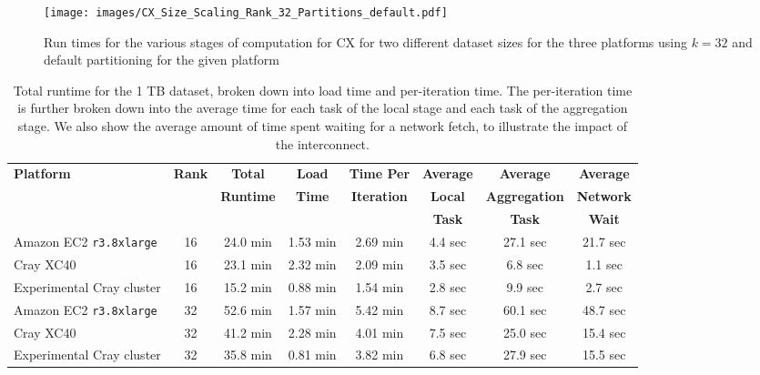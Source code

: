     \begin{figure} [H]
    \begin{centering}
    \texttt{[image: images/CX\_Size\_Scaling\_Rank\_32\_Partitions\_default.pdf]}
    \end{centering}
    \caption{ Run times for the various stages of computation for CX for two different dataset sizes for the three platforms using $k=32$ and default partitioning for the given platform}
    \label{fig:h2hrank32} 
    \end{figure}
    
    \begin{table*}
    \begin{center}
    \begin{tabular}{| l | c | c | c | c | c | c | c |}
    \toprule
    \textbf{Platform} & \textbf{Rank} & \textbf{Total} & \textbf{Load} & \textbf{Time Per} & \textbf{Average} & \textbf{Average} & \textbf{Average} \\
                               & & \textbf{Runtime} & \textbf{Time} & \textbf{Iteration} & \textbf{Local} & \textbf{Aggregation} & \textbf{Network} \\
                               & & & & & \textbf{Task} & \textbf{Task} & \textbf{Wait} \\
    \midrule
    Amazon EC2 \texttt{r3.8xlarge} & 16 & 24.0 min & 1.53 min & 2.69 min & 4.4 sec & 27.1 sec & 21.7 sec \\
    \midrule
    Cray XC40 & 16 & 23.1 min& 2.32 min & 2.09 min &  3.5 sec & 6.8 sec & 1.1 sec \\
    \midrule
    Experimental Cray cluster & 16 & 15.2 min & 0.88 min & 1.54 min &  2.8 sec & 9.9 sec & 2.7 sec \\
    \midrule
    Amazon EC2 \texttt{r3.8xlarge} & 32 & 52.6 min& 1.57 min & 5.42 min &  8.7 sec & 60.1 sec & 48.7 sec \\
    \midrule
    Cray XC40 & 32 & 41.2 min & 2.28 min & 4.01 min &  7.5 sec & 25.0 sec & 15.4 sec \\
    \midrule
   Experimental Cray cluster & 32 & 35.8 min & 0.81 min & 3.82 min &  6.8 sec & 27.9 sec & 15.5 sec \\
   \bottomrule
    \end{tabular}
    \end{center}
    \caption{Total runtime for the 1 TB dataset, broken down into load time and per-iteration time. The per-iteration time is further broken down into the average time for each task of the local stage and each task of the aggregation stage.  We also show the average amount of time spent waiting for a network fetch, to illustrate the impact of the interconnect.}
    \label{tab:h2hres1TB}
    \end{table*}
    
